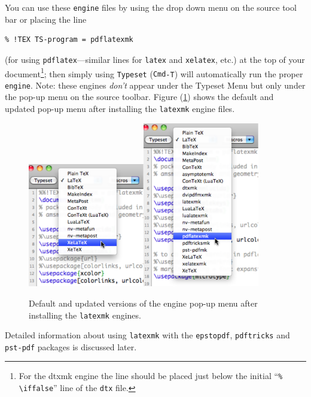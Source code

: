 \documentclass[11pt]{article}
\newcommand{\cmdkey}{\textsf{Cmd}}
\newcommand{\mnu}[1]{\textsf{#1}}
\begin{document}
You can use these \texttt{engine} files by using the drop down menu on the source tool bar or placing the line
\begin{verbatim}
% !TEX TS-program = pdflatexmk
\end{verbatim}
(for using \texttt{pdflatex}---similar lines for \texttt{latex} and \texttt{xelatex}, etc.) at the top of your document\footnote{For the dtxmk engine the line should be placed just below the initial ``\texttt{\% \textbackslash iffalse}'' line of the \texttt{dtx} file.}; then simply using \texttt{Typeset} (\texttt{\cmdkey-T}) will automatically run the proper \texttt{engine}. Note: these engines \emph{don't} appear under the \mnu{Typeset} Menu but only under the pop-up menu on the source toolbar. Figure (\ref{fig:popupmenus}) shows the default and updated pop-up menu after installing the \texttt{latexmk} engine files.
\begin{figure}
\centering
\includegraphics[width=2in]{figs/OriginalTypesetPopup}\qquad\includegraphics[width=2in]{figs/UpdatedTypesetPopup}
\caption{Default and updated versions of the engine pop-up menu after installing the \texttt{latexmk} engines.}\label{fig:popupmenus}
\end{figure}

Detailed information about using \texttt{latexmk} with the \texttt{epstopdf}, \texttt{pdftricks} and \texttt{pst-pdf} packages is discussed later.
\end{document}
